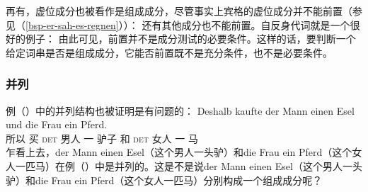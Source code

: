 再有，虚位成分也被看作是组成成分，尽管事实上宾格的虚位成分并不能前置（参见（\ref{bsp-er-sah-es-regnen}））：
\eal
{}
\zl
还有其他成分也不能前置。自反身代词就是一个很好的例子：
\eal
{}
\zl
由此可见，前置并不是成分测试的必要条件。这样的话，要判断一个给定词串是否是组成成分，它能否前置既不是充分条件，也不是必要条件。


\subsubsection{并列}
\label{Abschnitt-K-Tests-Koordination}
例（）中的并列结构也被证明是有问题的：
\ea
\label{ex-gapping}
\gll Deshalb kaufte der Mann einen Esel und die Frau ein Pferd.\\
	 所以 买 \textsc{det} 男人 一 驴子 和 \textsc{det} 女人 一 马\\
\z
乍看上去，der Mann einen Esel（这个男人一头驴）和die Frau ein Pferd（这个女人一匹马）在例（）中是并列的。这是不是说der Mann einen Esel（这个男人一头驴）和die Frau ein Pferd（这个女人一匹马）分别构成一个组成成分呢？

